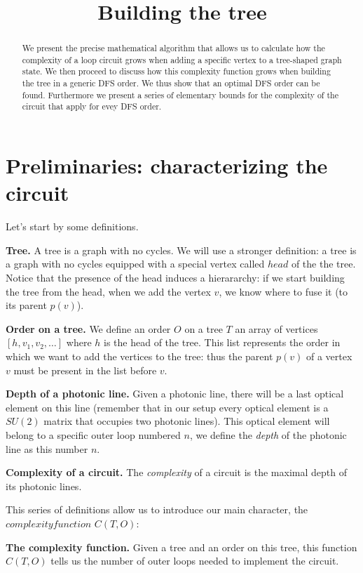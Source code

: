 \documentclass{article}
\title{Building the tree}
\date{}
\begin{document}
\maketitle
\begin{abstract}
    We present the precise mathematical algorithm that allows us to calculate how the complexity of a loop circuit grows when adding a specific vertex to a tree-shaped graph state. We then proceed to discuss how this complexity function grows when building the tree in a generic DFS order. We thus show that an optimal DFS order can be found. Furthermore we present a series of elementary bounds for the complexity of the circuit that apply for evey DFS order.
\end{abstract}

\tableofcontents

\newpage
\section{Preliminaries: characterizing the circuit}
Let's start by some definitions.

\textbf{Tree.} A tree is a graph with no cycles. We will use a stronger definition: a tree is a graph with no cycles equipped with a special vertex called $head$ of the the tree. Notice that the presence of the head induces a hierararchy: if we start building the tree from the head, when we add the vertex $v$, we know where to fuse it (to its parent $p(v)$).

\textbf{Order on a tree.} We define an order $O$ on a tree $T$ an array of vertices $[h, v_1, v_2, \dots]$ where $h$ is the head of the tree. This list represents the order in which we want to add the vertices to the tree: thus the parent $p(v)$ of a vertex $v$ must be present in the list before $v$.

\textbf{Depth of a photonic line.} Given a photonic line, there will be a last optical element on this line (remember that in our setup every optical element is a $SU(2)$ matrix that occupies two photonic lines). This optical element will belong to a specific outer loop numbered $n$, we define the \textit{depth} of the photonic line as this number $n$.

\textbf{Complexity of a circuit.} The \textit{complexity} of a circuit is the maximal depth of its photonic lines.

This series of definitions allow us to introduce our main character, the $complexity function$ $C(T, O)$:

\textbf{The complexity function.} Given a tree and an order on this tree, this function $C(T, O)$ tells us the number of outer loops needed to implement the circuit.
\end{document}

